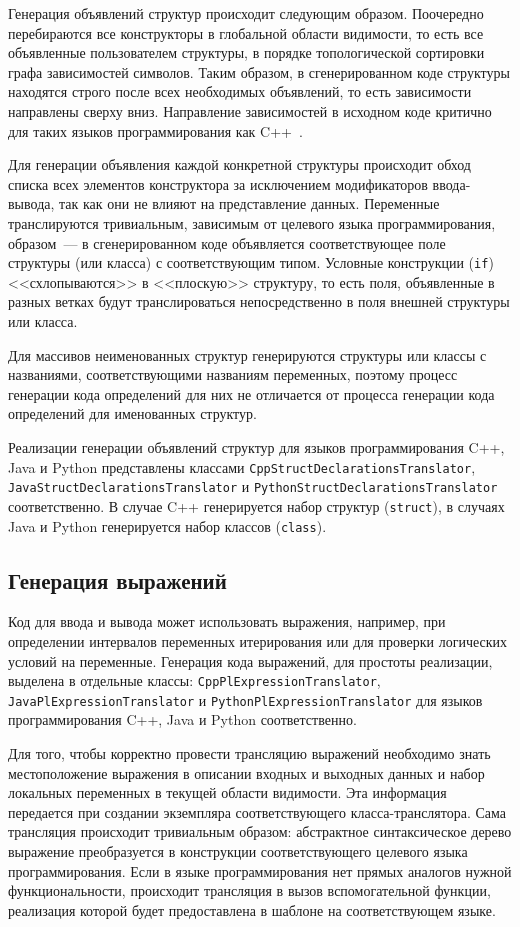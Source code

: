 \documentclass[times,specification,annotation]{style/itmo-student-thesis/itmo-student-thesis}
\begin{document}
Генерация объявлений структур происходит следующим образом. Поочередно перебираются все конструкторы в глобальной области видимости, то есть все объявленные пользователем структуры, в порядке топологической сортировки графа зависимостей символов. Таким образом, в сгенерированном коде структуры находятся строго после всех необходимых объявлений, то есть зависимости направлены сверху вниз. Направление зависимостей в исходном коде критично для таких языков программирования как C++~\cite{cppbook}.

Для генерации объявления каждой конкретной структуры происходит обход списка всех элементов конструктора за исключением модификаторов ввода-вывода, так как они не влияют на представление данных. Переменные транслируются тривиальным, зависимым от целевого языка программирования, образом~--- в сгенерированном коде объявляется соответствующее поле структуры (или класса) с соответствующим типом. Условные конструкции (\texttt{if}) <<схлопываются>> в <<плоскую>> структуру, то есть поля, объявленные в разных ветках будут транслироваться непосредственно в поля внешней структуры или класса.

Для массивов неименованных структур генерируются структуры или классы с названиями, соответствующими названиям переменных, поэтому процесс генерации кода определений для них не отличается от процесса генерации кода определений для именованных структур.

Реализации генерации объявлений структур для языков программирования C++, Java и Python представлены классами \texttt{CppStructDeclarationsTranslator}, \texttt{JavaStructDeclarationsTranslator} и \texttt{PythonStructDeclarationsTranslator} соответственно. В случае C++ генерируется набор структур (\texttt{struct}), в случаях Java и Python генерируется набор классов (\texttt{class}).

\subsection{Генерация выражений}

Код для ввода и вывода может использовать выражения, например, при определении интервалов переменных итерирования или для проверки логических условий на переменные. Генерация кода выражений, для простоты реализации, выделена в отдельные классы: \texttt{CppPlExpressionTranslator}, \texttt{JavaPlExpressionTranslator} и \texttt{PythonPlExpressionTranslator} для языков программирования C++, Java и Python соответственно.

Для того, чтобы корректно провести трансляцию выражений необходимо знать местоположение выражения в описании входных и выходных данных и набор локальных переменных в текущей области видимости. Эта информация передается при создании экземпляра соответствующего класса-транслятора. Сама трансляция происходит тривиальным образом: абстрактное синтаксическое дерево выражение преобразуется в конструкции соответствующего целевого языка программирования. Если в языке программирования нет прямых аналогов нужной функциональности, происходит трансляция в вызов вспомогательной функции, реализация которой будет предоставлена в шаблоне на соответствующем языке.
\end{document}
